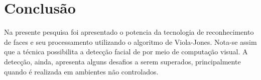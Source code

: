 \section{Conclusão}\label{sec:conclusao}

Na presente pesquisa foi apresentado o potencia da tecnologia de reconhecimento de faces e seu processamento utilizando o algoritmo de Viola-Jones.  Nota-se assim
que a técnica possibilita a detecção facial de por meio de computação visual. A detecção, ainda, apresenta alguns desafios a serem superados, principalmente quando é realizada em ambientes não controlados.

